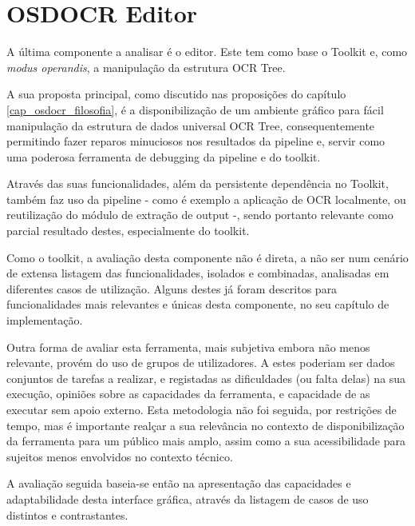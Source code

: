 

\section{OSDOCR Editor}


A última componente a analisar é o editor. Este tem como base o Toolkit e, como \textit{modus operandis}, a manipulação da estrutura OCR Tree. 

A sua proposta principal, como discutido nas proposições do capítulo \ref{cap_osdocr_filosofia}, é a disponibilização de um ambiente gráfico para fácil manipulação da estrutura de dados universal OCR Tree, consequentemente permitindo fazer reparos minuciosos nos resultados da pipeline e, servir como uma poderosa ferramenta de debugging da pipeline e do toolkit.

Através das suas funcionalidades, além da persistente dependência no Toolkit, também faz uso da pipeline - como é exemplo a aplicação de OCR localmente, ou reutilização do módulo de extração de output -, sendo portanto relevante como parcial resultado destes, especialmente do toolkit.

Como o toolkit, a avaliação desta componente não é direta, a não ser num cenário de extensa listagem das funcionalidades, isolados e combinadas, analisadas em diferentes casos de utilização. Alguns destes já foram descritos para funcionalidades mais relevantes e únicas desta componente, no seu capítulo de implementação. 

Outra forma de avaliar esta ferramenta, mais subjetiva embora não menos relevante, provém do uso de grupos de utilizadores. A estes poderiam ser dados conjuntos de tarefas a realizar, e registadas as dificuldades (ou falta delas) na sua execução, opiniões sobre as capacidades da ferramenta, e capacidade de as executar sem apoio externo. Esta metodologia não foi seguida, por restrições de tempo, mas é importante realçar a sua relevância no contexto de disponibilização da ferramenta para um público mais amplo, assim como a sua acessibilidade para sujeitos menos envolvidos no contexto técnico.

A avaliação seguida baseia-se então na apresentação das capacidades e adaptabilidade desta interface gráfica, através da listagem de casos de uso distintos e contrastantes.


